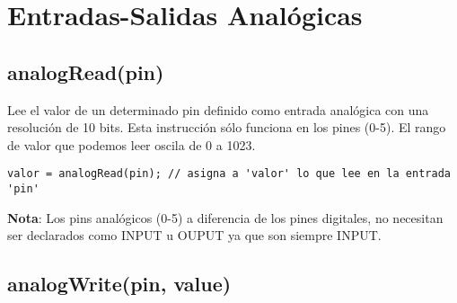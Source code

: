 \chapter{Entradas-Salidas Analógicas}
\section{analogRead(pin)}

Lee el valor de un determinado pin definido como entrada analógica con una resolución de 10 bits. Esta instrucción sólo funciona en los pines (0-5). El rango de valor que podemos leer oscila de 0 a 1023.\\
\begin{lstlisting}
valor = analogRead(pin); // asigna a 'valor' lo que lee en la entrada 'pin'
\end{lstlisting}
\textbf{Nota}: Los pins analógicos (0-5) a diferencia de los pines digitales, no necesitan ser declarados como INPUT u OUPUT ya que son siempre INPUT.
\section{analogWrite(pin, value)}

